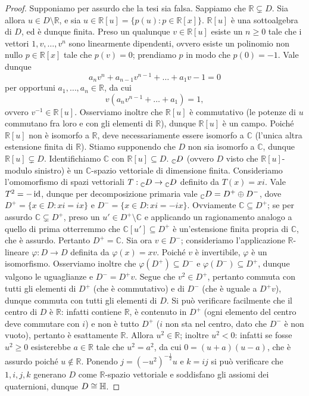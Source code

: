 \begin{proof}
Supponiamo per assurdo che la tesi sia falsa. Sappiamo che $\mathbb{R}\subsetneq D$. Sia allora $u\in D\setminus\mathbb{R}$, e sia $u\in\mathbb{R}[u]=\{p(u):p\in\mathbb{R}[x]\}$. $\mathbb{R}[u]$ è una sottoalgebra di $D$, ed è dunque finita. Preso un qualunque $v\in\mathbb{R}[u]$ esiste un $n\ge 0$ tale che i vettori $1,v,\ldots,v^n$ sono linearmente dipendenti, ovvero esiste un polinomio non nullo $p\in\mathbb{R}[x]$ tale che $p(v)=0$; prendiamo $p$ in modo che $p(0)=-1$. Vale dunque 
$$
a_nv^n+a_{n-1}v^{n-1}+\ldots+a_1v-1=0
$$
per opportuni $a_1,\ldots,a_n\in\mathbb{R}$, da cui
$$
v(a_nv^{n-1}+\ldots+a_1)=1,
$$
ovvero $v^{-1}\in\mathbb{R}[u]$. Osserviamo inoltre che $\mathbb{R}[u]$ è commutativo (le potenze di $u$ commutano fra loro e con gli elementi di $\mathbb{R}$), dunque $\mathbb{R}[u]$ è un campo. Poiché $\mathbb{R}[u]$ non è isomorfo a $\mathbb{R}$, deve necessariamente essere isomorfo a $\mathbb{C}$ (l'unica altra estensione finita di $\mathbb{R}$). Stiamo supponendo che $D$ non sia isomorfo a $\mathbb{C}$, dunque $\mathbb{R}[u]\subsetneq D$. Identifichiamo $\mathbb{C}$ con $\mathbb{R}[u]\subseteq D$. $\prescript{}{\mathbb{C}}{D}$ (ovvero $D$ visto che $\mathbb{R}[u]$-modulo sinistro) è un $\mathbb{C}$-spazio vettoriale di dimensione finita. Consideriamo l'omomorfismo di spazi vettoriali $T:\prescript{}{\mathbb{C}}{D}\to\prescript{}{\mathbb{C}}{D}$ definito da $T(x)=xi$. Vale $T^2=-\operatorname{id}$, dunque per decomposizione primaria vale $\prescript{}{\mathbb{C}}{D}=D^+\oplus D^-$, dove $D^+=\{x\in D:xi=ix\}$ e $D^-=\{x\in D:xi=-ix\}$. Ovviamente $\mathbb{C}\subseteq D^+$; se per assurdo $\mathbb{C}\subsetneq D^+$, preso un $u'\in D^+\setminus\mathbb{C}$ e applicando un ragionamento analogo a quello di prima otterremmo che $\mathbb{C}[u']\subseteq D^+$ è un'estensione finita propria di $\mathbb{C}$, che è assurdo. Pertanto $D^+=\mathbb{C}$. Sia ora $v\in D^-$; consideriamo l'applicazione $\mathbb{R}$-lineare $\varphi:D\to D$ definita da $\varphi(x)=xv$. Poiché $v$ è invertibile, $\varphi$ è un isomorfismo. Osserviamo inoltre che $\varphi(D^+)\subseteq D^-$ e $\varphi(D^-)\subseteq D^+$, dunque valgono le uguaglianze e $D^-=D^+v$. Segue che $v^2\in D^+$, pertanto commuta con tutti gli elementi di $D^+$ (che è commutativo) e di $D^-$ (che è uguale a $D^+v$), dunque commuta con tutti gli elementi di $D$. Si può verificare facilmente che il centro di $D$ è $\mathbb{R}$: infatti contiene $\mathbb{R}$, è contenuto in $D^+$ (ogni elemento del centro deve commutare con $i$) e non è tutto $D^+$ ($i$ non sta nel centro, dato che $D^-$ è non vuoto), pertanto è esattamente $\mathbb{R}$. Allora $u^2\in\mathbb{R}$; inoltre $u^2<0$: infatti se fosse $u^2\ge 0$ esisterebbe $a\in\mathbb{R}$ tale che $u^2=a^2$, da cui $0=(u+a)(u-a)$, che è assurdo poiché $u\not\in\mathbb{R}$. Ponendo $j=(-u^2)^{-\frac{1}{2}}u$ e $k=ij$ si può verificare che $1,i,j,k$ generano $D$ come $\mathbb{R}$-spazio vettoriale e soddisfano gli assiomi dei quaternioni, dunque $D\cong\mathbb{H}$.
\end{proof}


